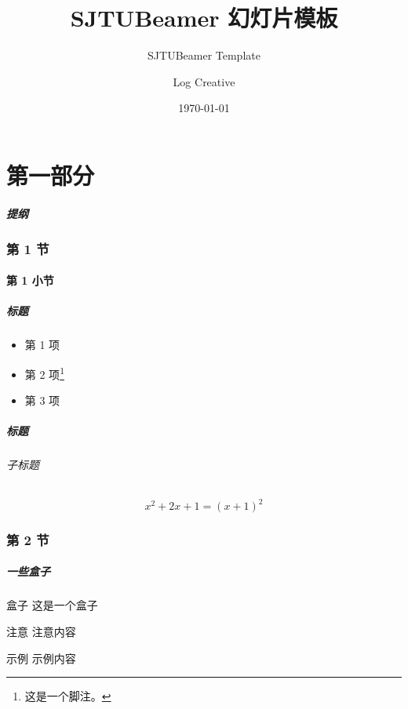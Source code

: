 \documentclass[
    aspectratio=169,                   %
]{beamer}
\institute[School of Mathematical Sciences]{数学科学学院}   %
\title{\textsf{SJTUBeamer} 幻灯片模板}  %
\subtitle{SJTUBeamer Template}         %
\author{Log Creative}                  %
\date{\today}                          %
\begin{document}
    \maketitle                         %

    \AtBeginPart{\frame{\partpage}}    %

\part{第一部分}

    \begin{frame}
        \frametitle{提纲}
        \tableofcontents               %
    \end{frame}

\section{第 1 节}
\subsection{第 1 小节}
    \begin{frame}
        \frametitle{标题}

        \begin{itemize}
            \item 第 1 项
            \item 第 2 项\footnote{这是一个脚注。}
            \item 第 3 项
        \end{itemize}

    \end{frame}

    \begin{frame}
        \frametitle{标题}
        \framesubtitle{子标题}

        \begin{equation}
            x^2+2x+1=(x+1)^2
        \end{equation}
        
    \end{frame}

\section{第 2 节}
    \begin{frame}
        \frametitle{一些盒子}
        
        \begin{block}{盒子}
            这是一个盒子\cite{beamerman}
        \end{block}

        \begin{alertblock}{注意}
            注意内容
        \end{alertblock}

        \begin{exampleblock}{示例}
            示例内容
        \end{exampleblock}
    \end{frame}
\end{document}
